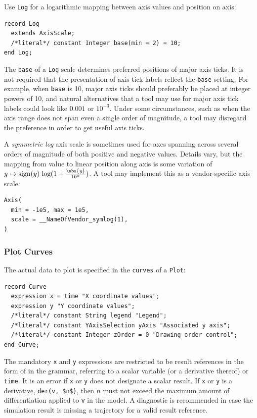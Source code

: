 Use \lstinline!Log! for a logarithmic mapping between axis values and position on axis:
\begin{lstlisting}[language=modelica]
record Log
  extends AxisScale;
  /*literal*/ constant Integer base(min = 2) = 10;
end Log;
\end{lstlisting}%

The \lstinline!base! of a \lstinline!Log! scale determines preferred positions of major axis ticks.
It is not required that the presentation of axis tick labels reflect the \lstinline!base! setting.
For example, when \lstinline!base! is 10, major axis ticks should preferably be placed at integer powers of 10, and natural alternatives that a tool may use for major axis tick labels could look like $0.001$ or $10^{-3}$.
Under some circumstances, such as when the axis range does not span even a single order of magnitude, a tool may disregard the preference in order to get useful axis ticks.

\begin{example}
A \emph{symmetric log} axis scale is sometimes used for axes spanning across several orders of magnitude of both positive and negative values.
Details vary, but the mapping from value to linear position along axis is some variation of $y \mapsto \operatorname{sign}(y)\, \operatorname{log}(1 + \frac{\abs{y}}{10^{\alpha}})$.
A tool may implement this as a vendor-specific axis scale:
\begin{lstlisting}[language=modelica]
Axis(
  min = -1e5, max = 1e5,
  scale = __NameOfVendor_symlog(1),
)
\end{lstlisting}
\end{example}

\subsubsection{Plot Curves}\label{plot-curves}

The actual data to plot is specified in the \lstinline!curves! of a \lstinline!Plot!:
\begin{lstlisting}[language=modelica]
record Curve
  expression x = time "X coordinate values";
  expression y "Y coordinate values";
  /*literal*/ constant String legend "Legend";
  /*literal*/ constant YAxisSelection yAxis "Associated y axis";
  /*literal*/ constant Integer zOrder = 0 "Drawing order control";
end Curve;
\end{lstlisting}

The mandatory \lstinline!x! and \lstinline!y! expressions are restricted to be result references in the form of  in the grammar, referring to a scalar variable (or a derivative thereof) or \lstinline!time!.
It is an error if \lstinline!x! or \lstinline!y! does not designate a scalar result.
If \lstinline!x! or \lstinline!y! is a derivative, \lstinline!der(v, $n$)!, then $n$ must not exceed the maximum amount of differentiation applied to \lstinline!v! in the model.
A diagnostic is recommended in case the simulation result is missing a trajectory for a valid result reference.

